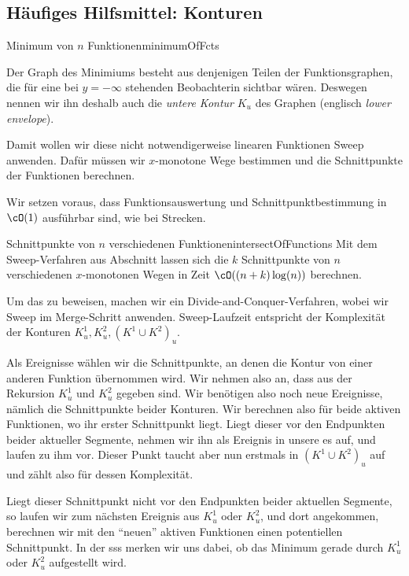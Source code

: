 \documentclass[language=ngerman,algolist,acrolist]{TemplateLecture}
\begin{document}
\subsection{Häufiges Hilfsmittel: Konturen}
\begin{prob}{Minimum von $n$ Funktionen}{minimumOfFcts}
\end{prob}

Der Graph des Minimiums besteht aus denjenigen Teilen der Funktionsgraphen, die für eine bei $y = -\infty$ stehenden Beobachterin sichtbar wären. Deswegen nennen wir ihn deshalb auch die \emph{untere Kontur} $K_u$ des Graphen (englisch \emph{lower envelope}).

Damit wollen wir diese nicht notwendigerweise linearen Funktionen Sweep anwenden. Dafür müssen wir $x$-monotone Wege bestimmen und die Schnittpunkte der Funktionen berechnen.

Wir setzen voraus, dass Funktionsauswertung und Schnittpunktbestimmung in $\cO(1)$ ausführbar sind, wie bei Strecken.

\begin{thm}{Schnittpunkte von $n$ verschiedenen Funktionen}{intersectOfFunctions}
    Mit dem Sweep-Verfahren aus Abschnitt lassen sich die $k$ Schnittpunkte von $n$ verschiedenen $x$-monotonen Wegen in Zeit $\cO((n + k) \log(n))$ berechnen.
\end{thm}

Um das zu beweisen, machen wir ein Divide-and-Conquer-Verfahren, wobei wir Sweep im Merge-Schritt anwenden. Sweep-Laufzeit entspricht der Komplexität der Konturen $K^1_u, K^2_u, (K^1 \cup K^2)_u$.


Als Ereignisse wählen wir die Schnittpunkte, an denen die Kontur von einer anderen Funktion übernommen wird. Wir nehmen also an, dass aus der Rekursion $K^1_u$ und $K^2_u$ gegeben sind. Wir benötigen also noch neue Ereignisse, nämlich die Schnittpunkte beider Konturen. Wir berechnen also für beide aktiven Funktionen, wo ihr erster Schnittpunkt liegt. Liegt dieser vor den Endpunkten beider aktueller Segmente, nehmen wir ihn als Ereignis in unsere \ac{es} auf, und laufen zu ihm vor. Dieser Punkt taucht aber nun erstmals in $(K^1 \cup K^2)_u$ auf und zählt also für dessen Komplexität.

Liegt dieser Schnittpunkt nicht vor den Endpunkten beider aktuellen Segmente, so laufen wir zum nächsten Ereignis aus $K^1_u$ oder $K^2_u$, und dort angekommen, berechnen wir mit den \enquote{neuen} aktiven Funktionen einen potentiellen Schnittpunkt. In der \ac{sss} merken wir uns dabei, ob das Minimum gerade durch $K^1_u$ oder $K^2_u$ aufgestellt wird.
\end{document}
